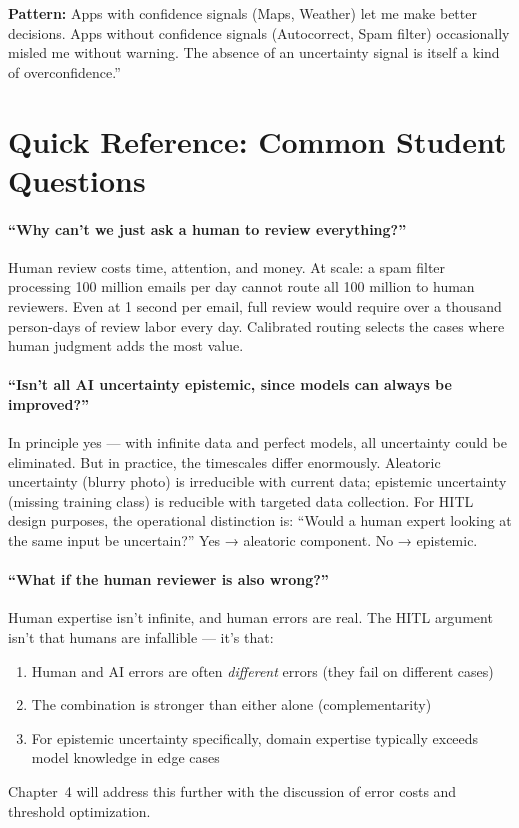 \textbf{Pattern:} Apps with confidence signals (Maps, Weather) let me make better decisions. Apps without confidence signals (Autocorrect, Spam filter) occasionally misled me without warning. The absence of an uncertainty signal is itself a kind of overconfidence.''

\section{Quick Reference: Common Student Questions}

\paragraph{``Why can't we just ask a human to review everything?''}
Human review costs time, attention, and money. At scale: a spam filter processing 100 million emails per day cannot route all 100 million to human reviewers. Even at 1 second per email, full review would require over a thousand person-days of review labor every day. Calibrated routing selects the cases where human judgment adds the most value.

\paragraph{``Isn't all AI uncertainty epistemic, since models can always be improved?''}
In principle yes --- with infinite data and perfect models, all uncertainty could be eliminated. But in practice, the timescales differ enormously. Aleatoric uncertainty (blurry photo) is irreducible with current data; epistemic uncertainty (missing training class) is reducible with targeted data collection. For HITL design purposes, the operational distinction is: ``Would a human expert looking at the same input be uncertain?'' Yes → aleatoric component. No → epistemic.

\paragraph{``What if the human reviewer is also wrong?''}
Human expertise isn't infinite, and human errors are real. The HITL argument isn't that humans are infallible --- it's that:
\begin{enumerate}
    \item Human and AI errors are often \emph{different} errors (they fail on different cases)
    \item The combination is stronger than either alone (complementarity)
    \item For epistemic uncertainty specifically, domain expertise typically exceeds model knowledge in edge cases
\end{enumerate}
Chapter~4 will address this further with the discussion of error costs and threshold optimization.
